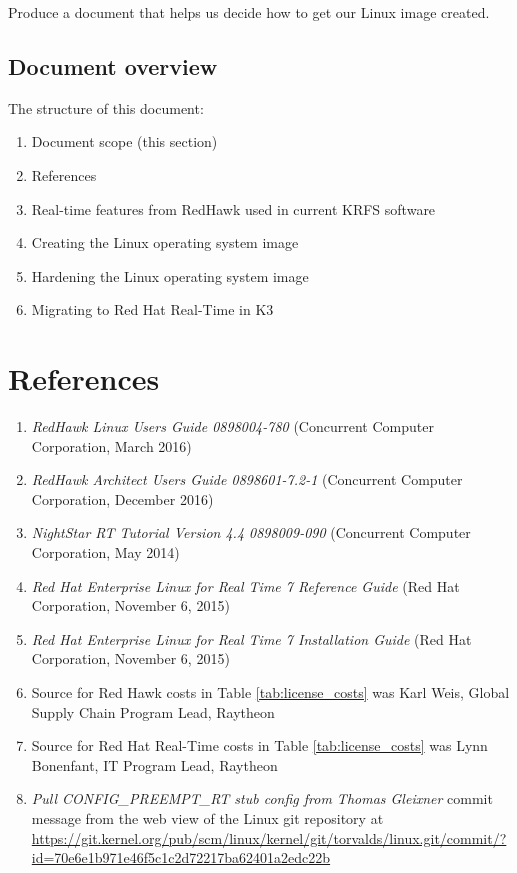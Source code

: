 \documentclass[12pt]{article}
\begin{document}
Produce a document that helps us decide how to get our Linux image created.


\subsection{Document overview}
The structure of this document:

\begin{enumerate}
    \item Document scope (this section)
    \item References
    \item Real-time features from RedHawk used in current KRFS software
    \item Creating the Linux operating system image
    \item Hardening the Linux operating system image
    \item Migrating to Red Hat Real-Time in K3
\end{enumerate}



%
\newpage
\section{References}

\begin{enumerate}
    \item \textit{RedHawk Linux Users Guide 0898004-780} (Concurrent Computer Corporation, March 2016) \label{ref:red_hawk_guide}
    \item \textit{RedHawk Architect Users Guide 0898601-7.2-1} (Concurrent Computer Corporation, December 2016) \label{ref:architect}
    \item \textit{NightStar RT Tutorial Version 4.4 0898009-090} (Concurrent Computer Corporation, May 2014) \label{ref:nightstar}
    \item \textit{Red Hat Enterprise Linux for Real Time 7 Reference Guide} (Red Hat Corporation, November 6, 2015) \label{ref:rhel7_ref}
    \item \textit{Red Hat Enterprise Linux for Real Time 7 Installation Guide} (Red Hat Corporation, November 6, 2015) \label{ref:rhel7_install}
    \item Source for Red Hawk costs in Table \ref{tab:license_costs} was Karl Weis, Global Supply Chain Program Lead, Raytheon \label{ref:karl}
    \item Source for Red Hat Real-Time costs in Table \ref{tab:license_costs} was Lynn Bonenfant, IT Program Lead, Raytheon \label{ref:lynn}
    \item \textit{Pull CONFIG\_PREEMPT\_RT stub config from Thomas Gleixner} commit message from the web view of the Linux git repository at \url{https://git.kernel.org/pub/scm/linux/kernel/git/torvalds/linux.git/commit/?id=70e6e1b971e46f5c1c2d72217ba62401a2edc22b} \label{ref:commit}
\end{enumerate}
\end{document}
